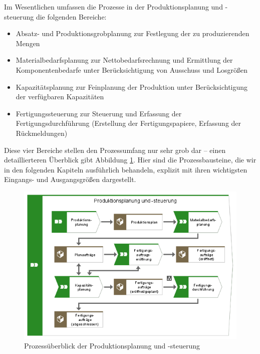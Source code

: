 Im Wesentlichen umfassen die Prozesse in der Produktionsplanung 
und -steuerung die folgenden Bereiche:

\begin{itemize}
    \item 
    Absatz- und Produktionsgrobplanung zur Festlegung der zu produzierenden Mengen
    \item 
    Materialbedarfsplanung zur Nettobedarfsrechnung und Ermittlung der Komponentenbedarfe unter Berücksichtigung von Ausschuss und Losgrößen
    \item 
    Kapazitätsplanung zur Feinplanung der Produktion unter Berücksichtigung der verfügbaren Kapazitäten
    \item 
    Fertigungssteuerung zur Steuerung und Erfassung der Fertigungsdurchführung (Erstellung der Fertigungspapiere, Erfassung der Rückmeldungen)
\end{itemize}


Diese vier Bereiche stellen den Prozessumfang nur sehr grob dar – einen detaillierteren Überblick gibt Abbildung \ref{fig:Prozessüberblick der Produktionsplanung und -steuerung}. Hier sind die Prozessbausteine, die wir in den folgenden Kapiteln ausführlich behandeln, explizit mit ihren wichtigsten Eingangs- und Ausgangsgrößen dargestellt.


\begin{figure}[H]
	\centering 
    \includegraphics[width=\textwidth]{img/Produktion.png}	
    \caption[Prozessüberblick der Produktionsplanung und -steuerung]
    {Prozessüberblick der Produktionsplanung und -steuerung \protect\footnotemark}
    \label{fig:Prozessüberblick der Produktionsplanung und -steuerung}
\end{figure}


